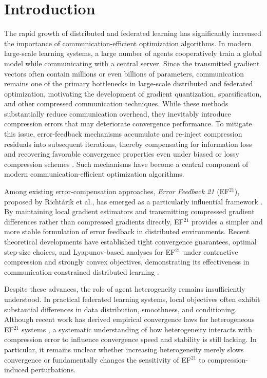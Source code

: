 \section{Introduction}

The rapid growth of distributed and federated learning has significantly increased the importance of communication-efficient optimization algorithms. In modern large-scale learning systems, a large number of agents cooperatively train a global model while communicating with a central server. Since the transmitted gradient vectors often contain millions or even billions of parameters, communication remains one of the primary bottlenecks in large-scale distributed and federated optimization, motivating the development of gradient quantization, sparsification, and other compressed communication techniques. While these methods substantially reduce communication overhead, they inevitably introduce compression errors that may deteriorate convergence performance. To mitigate this issue, error-feedback mechanisms accumulate and re-inject compression residuals into subsequent iterations, thereby compensating for information loss and recovering favorable convergence properties even under biased or lossy compression schemes \citep{seide2014onebit,stich2018sparsified,karimireddy2019error}. Such mechanisms have become a central component of modern communication-efficient optimization algorithms.

Among existing error-compensation approaches, \emph{Error Feedback 21} (EF$^{21}$), proposed by Richt\'arik et al., has emerged as a particularly influential framework \citep{richtarik2021ef21}. By maintaining local gradient estimators and transmitting compressed gradient differences rather than compressed gradients directly, EF$^{21}$ provides a simpler and more stable formulation of error feedback in distributed environments. Recent theoretical developments have established tight convergence guarantees, optimal step-size choices, and Lyapunov-based analyses for EF$^{21}$ under contractive compression and strongly convex objectives, demonstrating its effectiveness in communication-constrained distributed learning \citep{thomsen2026tight}.

Despite these advances, the role of agent heterogeneity remains insufficiently understood. In practical federated learning systems, local objectives often exhibit substantial differences in data distribution, smoothness, and conditioning. Although recent work has derived empirical convergence laws for heterogeneous EF$^{21}$ systems \citep{thomsen2026tight}, a systematic understanding of how heterogeneity interacts with compression error to influence convergence speed and stability is still lacking. In particular, it remains unclear whether increasing heterogeneity merely slows convergence or fundamentally changes the sensitivity of EF$^{21}$ to compression-induced perturbations.

